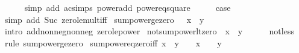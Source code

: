 \begin{isabellebody}
\ \ \ \ \isamarkupfalse%
\ {\isacharparenleft}{\kern0pt}simp\ add{\isacharcolon}{\kern0pt}\ ac{\isacharunderscore}{\kern0pt}simps\ power{\isacharunderscore}{\kern0pt}add\ power{}{\isacharunderscore}{\kern0pt}eq{\isacharunderscore}{\kern0pt}square{\isacharparenright}{\kern0pt}\isanewline
\ \ \isamarkupfalse%
\ \isamarkupfalse%
\ {\isacharquery}{\kern0pt}case\isanewline
\ \ \ \ \isamarkupfalse%
\ {\isacharparenleft}{\kern0pt}simp\ add{\isacharcolon}{\kern0pt}\ Suc\ zero{\isacharunderscore}{\kern0pt}le{\isacharunderscore}{\kern0pt}mult{\isacharunderscore}{\kern0pt}iff{\isacharparenright}{\kern0pt}\isanewline
{}\isamarkupfalse%
%
\endisatagproof
{\isafoldproof}%
%
\isadelimproof
\isanewline
%
\endisadelimproof
\isanewline
{}\isamarkupfalse%
\ sum{\isacharunderscore}{\kern0pt}power{}{\isacharunderscore}{\kern0pt}ge{\isacharunderscore}{\kern0pt}zero{\isacharcolon}{\kern0pt}\ {\isachardoublequoteopen}{}\ {\isasymle}\ x\ {\isacharplus}{\kern0pt}\ y\isanewline
%
\isadelimproof
\ \ %
\endisadelimproof
%
\isatagproof
{}\isamarkupfalse%
\ {\isacharparenleft}{\kern0pt}intro\ add{\isacharunderscore}{\kern0pt}nonneg{\isacharunderscore}{\kern0pt}nonneg\ zero{\isacharunderscore}{\kern0pt}le{\isacharunderscore}{\kern0pt}power{}{\isacharparenright}{\kern0pt}%
\endisatagproof
{\isafoldproof}%
%
\isadelimproof
\isanewline
%
\endisadelimproof
\isanewline
{}\isamarkupfalse%
\ not{\isacharunderscore}{\kern0pt}sum{\isacharunderscore}{\kern0pt}power{}{\isacharunderscore}{\kern0pt}lt{\isacharunderscore}{\kern0pt}zero{\isacharcolon}{\kern0pt}\ {\isachardoublequoteopen}{\isasymnot}\ x\ {\isacharplus}{\kern0pt}\ y\ {\isacharless}{\kern0pt}\ {}{\isachardoublequoteclose}\isanewline
%
\isadelimproof
\ \ %
\endisadelimproof
%
\isatagproof
{}\isamarkupfalse%
\ not{\isacharunderscore}{\kern0pt}less\ \isamarkupfalse%
\ {\isacharparenleft}{\kern0pt}rule\ sum{\isacharunderscore}{\kern0pt}power{}{\isacharunderscore}{\kern0pt}ge{\isacharunderscore}{\kern0pt}zero{\isacharparenright}{\kern0pt}%
\endisatagproof
{\isafoldproof}%
%
\isadelimproof
\isanewline
%
\endisadelimproof
\isanewline
{}\isamarkupfalse%
\ sum{\isacharunderscore}{\kern0pt}power{}{\isacharunderscore}{\kern0pt}eq{\isacharunderscore}{\kern0pt}zero{\isacharunderscore}{\kern0pt}iff{\isacharcolon}{\kern0pt}\ {\isachardoublequoteopen}x\ {\isacharplus}{\kern0pt}\ y\ {\isacharequal}{\kern0pt}\ {}\ {\isasymlongleftrightarrow}\ x\ {\isacharequal}{\kern0pt}\ {}\ {\isasymand}\ y\ {\isacharequal}{\kern0pt}\ {}{\isachardoublequoteclose}\isanewline

\end{isabellebody}
